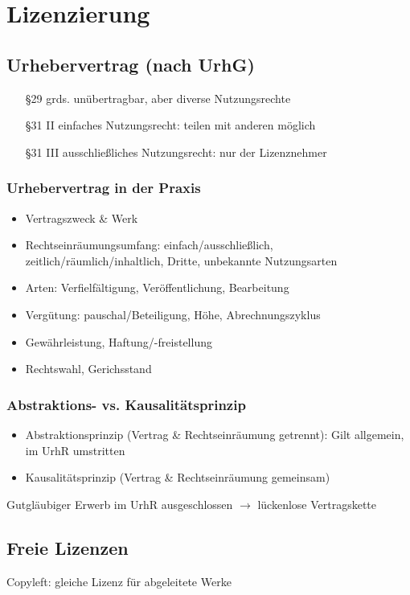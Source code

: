 \documentclass{article}
\begin{document}
\section{Lizenzierung}

\subsection{Urhebervertrag (nach UrhG)}
\begin{itemize}
  \item[§29] grds. unübertragbar, aber diverse Nutzungsrechte
  \item[§31 II] einfaches Nutzungsrecht: teilen mit anderen möglich
  \item[§31 III] ausschließliches Nutzungsrecht: nur der Lizenznehmer
\end{itemize}

\subsubsection{Urhebervertrag in der Praxis}
\begin{itemize}
  \item Vertragszweck \& Werk
  \item Rechtseinräumungsumfang: einfach/ausschließlich, zeitlich/räumlich/inhaltlich, Dritte, unbekannte Nutzungsarten
  \item Arten: Verfielfältigung, Veröffentlichung, Bearbeitung
  \item Vergütung: pauschal/Beteiligung, Höhe, Abrechnungszyklus
  \item Gewährleistung, Haftung/-freistellung
  \item Rechtswahl, Gerichsstand
\end{itemize}

\subsubsection{Abstraktions- vs. Kausalitätsprinzip}
\begin{itemize}
  \item Abstraktionsprinzip (Vertrag \& Rechtseinräumung getrennt): Gilt allgemein, im UrhR umstritten
  \item Kausalitätsprinzip (Vertrag \& Rechtseinräumung gemeinsam)
\end{itemize}

Gutgläubiger Erwerb im UrhR ausgeschlossen $\to$ lückenlose Vertragskette

\subsection{Freie Lizenzen}
Copyleft: gleiche Lizenz für abgeleitete Werke
\end{document}
